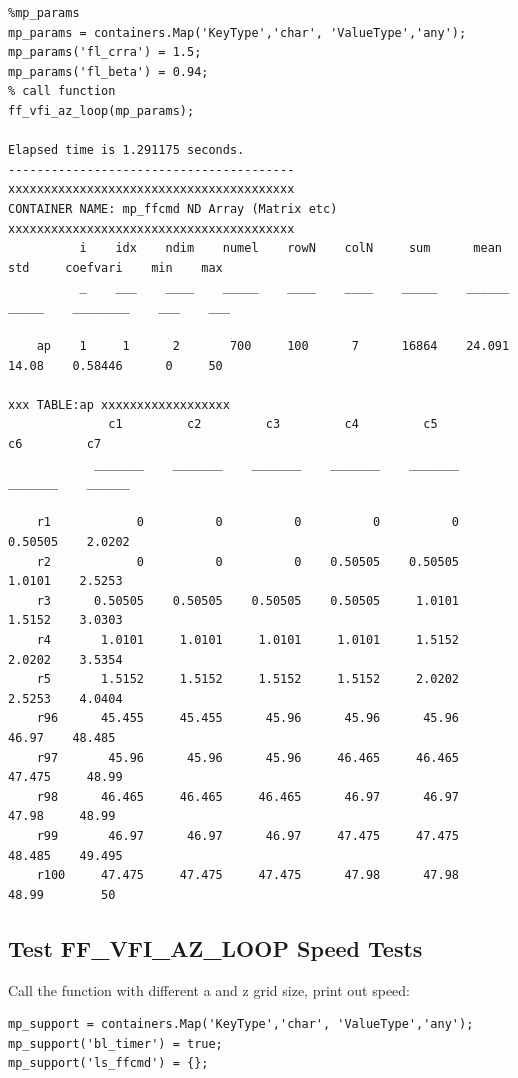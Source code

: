 \documentclass[
]{book}
\begin{document}
\begin{verbatim}
%mp_params
mp_params = containers.Map('KeyType','char', 'ValueType','any');
mp_params('fl_crra') = 1.5;
mp_params('fl_beta') = 0.94;
% call function
ff_vfi_az_loop(mp_params);

Elapsed time is 1.291175 seconds.
----------------------------------------
xxxxxxxxxxxxxxxxxxxxxxxxxxxxxxxxxxxxxxxx
CONTAINER NAME: mp_ffcmd ND Array (Matrix etc)
xxxxxxxxxxxxxxxxxxxxxxxxxxxxxxxxxxxxxxxx
          i    idx    ndim    numel    rowN    colN     sum      mean      std     coefvari    min    max
          _    ___    ____    _____    ____    ____    _____    ______    _____    ________    ___    ___

    ap    1     1      2       700     100      7      16864    24.091    14.08    0.58446      0     50 

xxx TABLE:ap xxxxxxxxxxxxxxxxxx
              c1         c2         c3         c4         c5         c6         c7  
            _______    _______    _______    _______    _______    _______    ______

    r1            0          0          0          0          0    0.50505    2.0202
    r2            0          0          0    0.50505    0.50505     1.0101    2.5253
    r3      0.50505    0.50505    0.50505    0.50505     1.0101     1.5152    3.0303
    r4       1.0101     1.0101     1.0101     1.0101     1.5152     2.0202    3.5354
    r5       1.5152     1.5152     1.5152     1.5152     2.0202     2.5253    4.0404
    r96      45.455     45.455      45.96      45.96      45.96      46.97    48.485
    r97       45.96      45.96      45.96     46.465     46.465     47.475     48.99
    r98      46.465     46.465     46.465      46.97      46.97      47.98     48.99
    r99       46.97      46.97      46.97     47.475     47.475     48.485    49.495
    r100     47.475     47.475     47.475      47.98      47.98      48.99        50
\end{verbatim}

\hypertarget{test-ff_vfi_az_loop-speed-tests}{%
\subsection{Test FF\_VFI\_AZ\_LOOP Speed Tests}\label{test-ff_vfi_az_loop-speed-tests}}

Call the function with different a and z grid size, print out speed:

\begin{verbatim}
mp_support = containers.Map('KeyType','char', 'ValueType','any');
mp_support('bl_timer') = true;
mp_support('ls_ffcmd') = {};
\end{verbatim}
\end{document}
